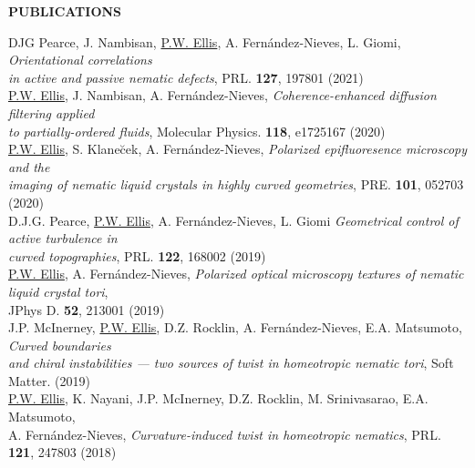 \documentclass[10pt]{article}
\newenvironment{changemargin}[2]{%
  \list{}{\rightmargin#2\leftmargin#1
    \parsep=0pt\topsep=1pt\partopsep=0pt}
\item[]} {\endlist}
\newenvironment{indentmore}{\begin{changemargin}{10pt}{0cm}}{\end{changemargin}}
\begin{document}
\vspace{10pt}
\textbf{\large PUBLICATIONS}
\begin{indentmore}
DJG Pearce, J. Nambisan, \underline{P.W. Ellis},  A. Fern\'{a}ndez-Nieves, L. Giomi, \emph{Orientational correlations \\ \hspace*{15pt} in active and passive nematic defects}, PRL. {\bf 127}, 197801 (2021)\\

\underline{P.W. Ellis}, J. Nambisan, A. Fern\'{a}ndez-Nieves, \emph{Coherence-enhanced diffusion filtering applied \\ \hspace*{15pt} to partially-ordered fluids}, Molecular Physics. {\bf 118}, e1725167 (2020)\\

\underline{P.W. Ellis}, S. Klane\u{c}ek, A. Fern\'{a}ndez-Nieves, \emph{Polarized epifluoresence microscopy and the \\ \hspace*{15pt} imaging of nematic liquid crystals in highly curved geometries}, PRE. {\bf 101}, 052703 (2020)\\

D.J.G. Pearce, \underline{P.W. Ellis}, A. Fern\'{a}ndez-Nieves, L. Giomi \emph{Geometrical control of active turbulence in \\ \hspace*{15pt} curved topographies}, PRL. {\bf 122}, 168002 (2019)\\

\underline{P.W. Ellis}, A. Fern\'{a}ndez-Nieves, \emph{Polarized optical microscopy textures of nematic liquid crystal tori}, \\ \hspace*{15pt} JPhys D. {\bf 52}, 213001 (2019)\\

J.P. McInerney, \underline{P.W. Ellis}, D.Z. Rocklin, A. Fern\'{a}ndez-Nieves, E.A. Matsumoto, \emph{Curved boundaries \\ \hspace*{15pt} and chiral instabilities --- two sources of twist in homeotropic nematic tori}, Soft Matter. (2019) \\

\underline{P.W. Ellis}, K. Nayani, J.P. McInerney, D.Z. Rocklin, M. Srinivasarao, E.A. Matsumoto, \\ \hspace*{15pt} A. Fern\'{a}ndez-Nieves, \emph{Curvature-induced twist in homeotropic nematics}, PRL. {\bf 121}, 247803 (2018) \\


\end{indentmore}
\end{document}
